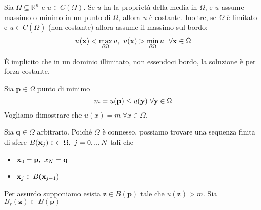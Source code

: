 \begin{theorem}
    \label{thm:principio-di-massimo-armoniche}
    Sia $\Omega \subseteq \mathbb{R}^{n}$ e $u\in C(\Omega)$. Se $u$ ha la proprietà della media in $\Omega $, e $u$ assume massimo o minimo in un punto di $\Omega $, allora $u$ è costante. Inoltre, se $\Omega $ è limitato e $u\in C(\overline{\Omega })$ (non costante) allora assume il massimo sul bordo:
    \begin{equation*}
        u(\x) < \max_{\partial \Omega } u,\ u(\x)  >\min_{\partial \Omega } u\ \ \forall \x\in \Omega
    \end{equation*}
\end{theorem}
È implicito che in un dominio illimitato, non essendoci bordo, la soluzione è per forza costante.
\begin{dimostrazione}
    Sia $\mathbf{p}\in \Omega $ punto di minimo
    \begin{equation*}
        m=u(\mathbf{p}) \leq u(\y) \ \forall \y\in \Omega
    \end{equation*}
    Vogliamo dimostrare che $u(x) =m\ \forall x\in \Omega $.

    Sia $\mathbf{q}\in \Omega $ arbitrario. Poiché $\Omega $ è connesso, possiamo trovare una sequenza finita di sfere $B(\x_{j}) \subset \subset \Omega,\ j=0,..,N$ tali che
    \begin{itemize}
        \item $\x_{0} =\mathbf{p},\ x_{N} =\mathbf{q}$
        \item $\x_{j} \in B(\x_{j-1})$
    \end{itemize}
    Per assurdo supponiamo esista $\mathbf{z}\in B(\mathbf{p})$ tale che $u(\mathbf{z})  >m$. Sia $B_{r}(\mathbf{z}) \subset B(\mathbf{p})$

    \begin{figure}[H]
        \centering

        \begin{tikzpicture}[x=0.75pt,y=0.75pt,yscale=-1,xscale=1]


\end{tikzpicture}
\end{figure}
\end{dimostrazione}
